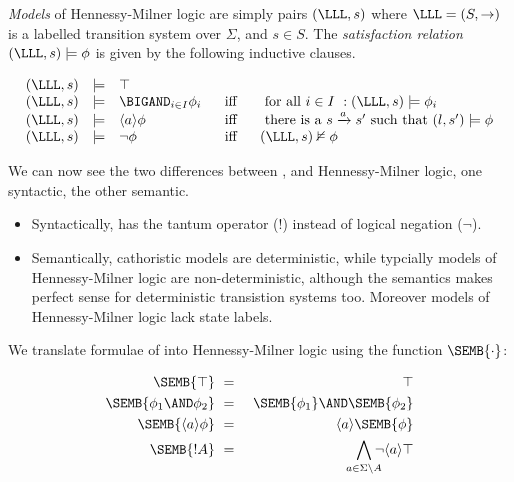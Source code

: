 \begin{definition}
 \emph{Models} of Hennessy-Milner logic are simply pairs $(\LLL, s)$
 where $\LLL = (S, \rightarrow)$ is a labelled transition system over
 $\Sigma$, and $s \in S$.  The \emph{satisfaction relation} $(\LLL, s)
 \models \phi$ is given by the following inductive clauses.

\[
\begin{array}{lclcl}
  (\LLL, s) 
     & \models & 
  \top  \\
  (\LLL, s) 
     & \models & 
  \BIGAND_{i \in I} \phi_i  &\  \mbox{ iff }\  & \mbox { for all $i \in I$ }: (\LLL, s) \models \phi_i  \\
  (\LLL, s) 
     & \models & 
  \langle a \rangle \phi & \mbox{ iff } & \mbox{ there is a } s \xrightarrow{a} s' \mbox { such that } (l,s') \models \phi  \\
  (\LLL, s) 
     & \models & 
  \neg \phi & \mbox{ iff } & (\LLL, s)  \nvDash \phi 
\end{array}
\]
\end{definition}

\NI We can now see the two differences between \cathoristic{}, and
Hennessy-Milner logic, one syntactic, the other semantic.

\begin{itemize}

\item Syntactically, \cathoristic{} has the tantum operator ($!$) instead of
  logical negation ($\neg$).

\item Semantically,  cathoristic models are deterministic,
  while typcially models of Hennessy-Milner logic are
  non-deterministic, although the semantics makes perfect sense for
  deterministic transistion systems too. 
  Moreover models of Hennessy-Milner logic lack state labels.

\end{itemize}

\begin{definition}
 We translate formulae of \cathoristic{} into Hennessy-Milner logic
 using the function $\SEMB{\cdot}$:

\begin{eqnarray*}
  \SEMB{\top} & \ = \ & \top  \\
  \SEMB{\phi_1 \AND \phi_2} & \ = \ & \SEMB{\phi_1} \AND \SEMB{\phi_2}  \\
  \SEMB{\langle a \rangle \phi} & \ = \ & \langle a \rangle \SEMB{\phi}  \\
  \SEMB{! A} & \ = \ & \bigwedge_{a \in \Sigma \setminus A}\!\!\!\! \neg \langle a \rangle \top 
\end{eqnarray*}

\end{definition}

